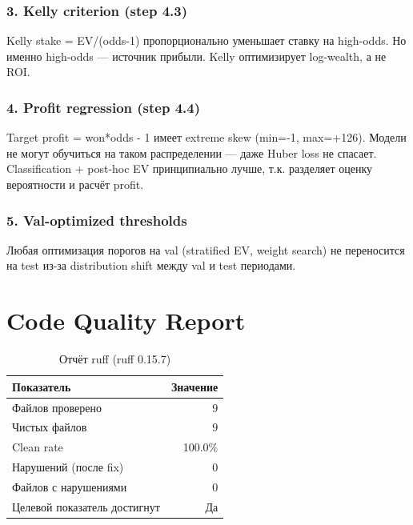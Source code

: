 \documentclass[12pt,a4paper]{article}
\begin{document}
\subsubsection{3. Kelly criterion (step 4.3)}
Kelly stake = EV/(odds-1) пропорционально уменьшает ставку на high-odds. Но именно high-odds — источник прибыли. Kelly оптимизирует log-wealth, а не ROI.

\subsubsection{4. Profit regression (step 4.4)}
Target profit = won*odds - 1 имеет extreme skew (min=-1, max=+126). Модели не могут обучиться на таком распределении — даже Huber loss не спасает. Classification + post-hoc EV принципиально лучше, т.к. разделяет оценку вероятности и расчёт profit.

\subsubsection{5. Val-optimized thresholds}
Любая оптимизация порогов на val (stratified EV, weight search) не переносится на test из-за distribution shift между val и test периодами.








\section{Code Quality Report}

\begin{table}[H]
\centering
\caption{Отчёт ruff (ruff 0.15.7)}
\begin{tabular}{lr}
\toprule
Показатель & Значение \\
\midrule
Файлов проверено & 9 \\
Чистых файлов & 9 \\
Clean rate & \textcolor{passcolor}{100.0\%} \\
Нарушений (после fix) & \textcolor{passcolor}{0} \\
Файлов с нарушениями & 0 \\
Целевой показатель достигнут & \textcolor{passcolor}{Да} \\
\bottomrule
\end{tabular}
\end{table}
\end{document}
